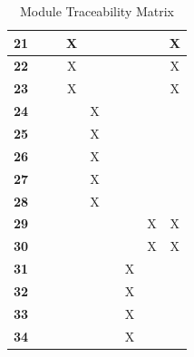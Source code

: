 \documentclass[12pt, titlepage]{article}
\begin{document}
\begin{table}
\begin{tabular}{|c|c|c|c|c|c|c|c|c|}
\textbf{21} &                     &                     &     X                &                     &                   &                  &                       &X \\ \hline
\textbf{22} &                     &                     &     X                &                     &                   &                  &                       &X \\ \hline
\textbf{23} &                     &                     &     X                &                     &                   &                  &                       &X \\ \hline
\textbf{24} &                     &                     &                     & X                    &                   &                  &                       & \\ \hline
\textbf{25} &                     &                     &                     & X                    &                   &                  &                       & \\ \hline
\textbf{26} &                     &                     &                     & X                    &                   &                  &                       & \\ \hline
\textbf{27} &                     &                     &                     & X                    &                   &                  &                       & \\ \hline
\textbf{28} &                     &                     &                     & X                    &                   &                  &                       & \\ \hline
\textbf{29} &                     &                     &                     &                     &                   &                  & X                      & X\\ \hline
\textbf{30} &                     &                     &                     &                     &                   &                  &X                       &X \\ \hline
\textbf{31} &                     &                     &                     &                     &                   &X                  &                       & \\ \hline
\textbf{32} &                     &                     &                     &                     &                   &X                 &                       & \\ \hline
\textbf{33} &                     &                     &                     &                     &                   &X                  &                       & \\ \hline
\textbf{34} &                     &                     &                     &                     &                   &X                  &                       & \\ \hline
  \end{tabular}
  \caption{Module Traceability Matrix}
  \label{Table:A_Mod_trace}
\end{table}
\end{document}
